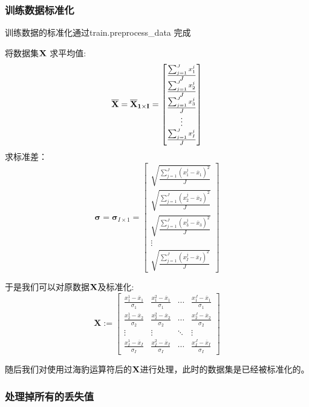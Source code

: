\subsubsection{训练数据标准化}
训练数据的标准化通过train.preprocess\_data 完成
\par 将数据集$\bf{X}$ 求平均值:
\[
\bf{\overline{X}} =\bf{\overline{X}_{1 \times I}} = \begin{bmatrix}
\frac{\sum_{j=1}^{J} x_{1}^{j}}{J}
 \\ \frac{\sum_{j=1}^{J} x_{2}^{j}}{J}
 \\\frac{\sum_{j=1}^{J} x_{3}^{j}}{J}
\\\vdots
\\\frac{\sum_{j=1}^{J} x_{I}^{j}}{J}

\end{bmatrix} 
\]
求标准差：
\[
\boldsymbol{\sigma} = \boldsymbol{\sigma}_{I \times 1} = \begin{bmatrix}
\sqrt{\frac{\sum_{j=1}^{J} \left(x_{1}^{j} - \overline{x}_{1}\right)^2}{J}} \\
\sqrt{\frac{\sum_{j=1}^{J} \left(x_{2}^{j} - \overline{x}_{2}\right)^2}{J}} \\
\sqrt{\frac{\sum_{j=1}^{J} \left(x_{3}^{j} - \overline{x}_{3}\right)^2}{J}} \\
\vdots \\
\sqrt{\frac{\sum_{j=1}^{J} \left(x_{I}^{j} - \overline{x}_{I}\right)^2}{J}}
\end{bmatrix}
\]

于是我们可以对原数据$\bf{X}$及标准化:
\[
	\boldsymbol{X} := \begin{bmatrix}
	\frac{x_{1}^{1} - \overline{x}_{1}}{\sigma_{1}} & \frac{x_{1}^{2} - \overline{x}_{1}}{\sigma_{1}} & \cdots & \frac{x_{1}^{J} - \overline{x}_{1}}{\sigma_{1}} \\
	\frac{x_{2}^{1} - \overline{x}_{2}}{\sigma_{2}} & \frac{x_{2}^{2} - \overline{x}_{2}}{\sigma_{2}} & \cdots & \frac{x_{2}^{J} - \overline{x}_{2}}{\sigma_{2}} \\
	\vdots & \vdots & \ddots & \vdots \\
	\frac{x_{I}^{1} - \overline{x}_{I}}{\sigma_{I}} & \frac{x_{I}^{2} - \overline{x}_{I}}{\sigma_{I}} & \cdots & \frac{x_{I}^{J} - \overline{x}_{I}}{\sigma_{I}}
	\end{bmatrix}
\]

随后我们对使用过海豹运算符后的$\bf{X}$进行处理，此时的数据集是已经被标准化的。
\clearpage
\subsubsection{处理掉所有的丢失值}

